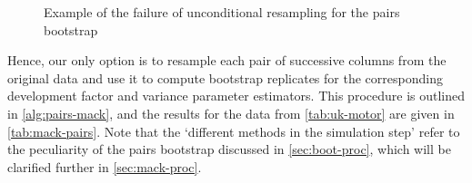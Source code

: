 \documentclass[a4paper]{book}
\begin{document}
\begin{figure}[!htb]
  \centering
  \caption{Example of the failure of unconditional resampling for the pairs bootstrap}
  \label{fig:uncond-pairs-resample}
\end{figure}

Hence, our only option is to resample each pair of successive columns from the original data and use it to compute bootstrap replicates for the corresponding development factor and variance parameter estimators. This procedure is outlined in \cref{alg:pairs-mack}, and the results for the data from \cref{tab:uk-motor} are given in \cref{tab:mack-pairs}. Note that the `different methods in the simulation step' refer to the peculiarity of the pairs bootstrap discussed in \cref{sec:boot-proc}, which will be clarified further in \cref{sec:mack-proc}.
\end{document}
